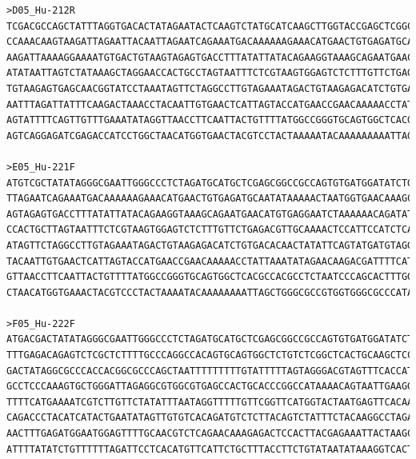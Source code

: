 \begin{verbatim}
>D05_Hu-212R
TCGACGCCAGCTATTTAGGTGACACTATAGAATACTCAAGTCTATGCATCAAGCTTGGTACCGAGCTCGGCTCCACTAGTAACGGCCGCCAGTGTGCTGGAATTCGCCCTTCAGTGAACG
CCAAACAAGTAAGATTAGAATTACAATTAGAATCAGAAATGACAAAAAAGAAACATGAACTGTGAGATGCAATATAAAAACTAATGGTGAACAAAGCAAAGAATAAAAAATAAAAACGGA
AAGATTAAAAGGAAAATGTGACTGTAAGTAGAGTGACCTTTATATTATACAGAAGGTAAAGCAGAATGAACATGTGAGGAATCTAAAAAACAGATATAAAATAGAAACAACTGAAGGCTT
ATATAATTAGTCTATAAAGCTAGGAACCACTGCCTAGTAATTTCTCGTAAGTGGAGTCTCTTTGTTCTGAGACGTTGCAAAACTCCATTCCATCTCAAAGTTATTTTTAATGTTAAAATT
TGTAAGAGTGAGCAACGGTATCCTAAATAGTTCTAGGCCTTGTAGAAATAGACTGTAAGAGACATCTGTGACACAACTATATTCAGTATGATGTAGGGTCTGTTACAATGGGATGAAGTG
AATTTAGATTATTTCAAGACTAAACCTACAATTGTGAACTCATTAGTACCATGAACCGAACAAAAACCTATTAAATATAGAACAAGACGACTTTCATGAAAAAATAAATATGAACAAATC
AGTATTTTCAGTTGTTTGAAATATAGGTTAACCTTCAATTACTGTTTTATGGCCGGGTGCAGTGGCTCACGCCACGCCTCTAATCCCAGCACTTTGGGAGGCCGAGGCAGGCGGATCATG
AGTCAGGAGATCGAGACCATCCTGGCTAACATGGTGAACTACGTCCTACTAAAAATACAAAAAAAAATTAGCTGGGCGCCGTGGTGGGCGCCTATAGTCCAGCTACTTTG

>E05_Hu-221F
ATGTCGCTATATAGGGCGAATTGGGCCCTCTAGATGCATGCTCGAGCGGCCGCCAGTGTGATGGATATCTGCAGAATTCGCCCTTCAGTGAACGCCAAACAAGTAAGATTAGAATTACAA
TTAGAATCAGAAATGACAAAAAAGAAACATGAACTGTGAGATGCAATATAAAAACTAATGGTGAACAAAGCAAAGAATAAAAAATAAAAACGGAAAGATTAAAAGGAAAATGTGACTGTA
AGTAGAGTGACCTTTATATTATACAGAAGGTAAAGCAGAATGAACATGTGAGGAATCTAAAAAACAGATATAAAATAGAAACAACTGAAGGCTTATATAATTAGTCTATAAAGCTAGGAA
CCACTGCTTAGTAATTTCTCGTAAGTGGAGTCTCTTTGTTCTGAGACGTTGCAAAACTCCATTCCATCTCAAAGTTATTTTTAATGTTAAAATTTGTAAGAGTGAGCAACGGTATCCTAA
ATAGTTCTAGGCCTTGTAGAAATAGACTGTAAGAGACATCTGTGACACAACTATATTCAGTATGATGTAGGGTCTGTTACAATGGGATGAAGTGAATTTAGATTATTTCAAGACTAAACC
TACAATTGTGAACTCATTAGTACCATGAACCGAACAAAAACCTATTAAATATAGAACAAGACGATTTTCATGAAAAAATAAATATGAACAAATCAGTATTTTCAGTTGTTTGAAATATAG
GTTAACCTTCAATTACTGTTTTATGGCCGGGTGCAGTGGCTCACGCCACGCCTCTAATCCCAGCACTTTGGGAGGCCGAGGCACGCGGATCATGGGGTCAGGAGATCGAGACCATCCTGG
CTAACATGGTGAAACTACGTCCCTACTAAAATACAAAAAAAATTAGCTGGGCGCCGTGGTGGGCGCCCATAGTCCCAGC

>F05_Hu-222F
ATGACGACTATATAGGGCGAATTGGGCCCTCTAGATGCATGCTCGAGCGGCCGCCAGTGTGATGGATATCTGCAGAATTCGCCCTTGGCCACGCGTCGACTAGTACTTTTTTTTTTTTTT
TTTGAGACAGAGTCTCGCTCTTTTGCCCAGGCCACAGTGCAGTGGCTCTGTCTCGGCTCACTGCAAGCTCCGCCTCCCGGGTTCATGCCATTCTTCTGCATCAGCCTCCCAAGTAGCTGG
GACTATAGGCGCCCACCACGGCGCCCAGCTAATTTTTTTTTGTATTTTTAGTAGGGACGTAGTTTCACCATGTTAGCCAGGATGGTCTCGATCTCCTGACCTCATGATCCGCCTGCCTCG
GCCTCCCAAAGTGCTGGGATTAGAGGCGTGGCGTGAGCCACTGCACCCGGCCATAAAACAGTAATTGAAGGTTAACCTATATTTCAAACAACTGAAAATACTGATTTGTTCATATTTATT
TTTTCATGAAAATCGTCTTGTTCTATATTTAATAGGTTTTTGTTCGGTTCATGGTACTAATGAGTTCACAATTGTAGGTTTAGTCTTGAAATAATCTAAATTCACTTCATCCCATTGTAA
CAGACCCTACATCATACTGAATATAGTTGTGTCACAGATGTCTCTTACAGTCTATTTCTACAAGGCCTAGAACTATTTAGGATACCGTTGCTCACTCTTACAAATTTTAACATTAAAAAT
AACTTTGAGATGGAATGGAGTTTTGCAACGTCTCAGAACAAAGAGACTCCACTTACGAGAAATTACTAAGCAGTGGTTCCTAGCTTTATAGACTAATTATATAAGCCTTCAGTTGTTTCT
ATTTTATATCTGTTTTTTAGATTCCTCACATGTTCATTCTGCTTTACCTTCTGTATAATATAAAGGTCACTCTACTTACAGTCACATTTCCCTTTTAATCTTTCCGTTT


\end{verbatim}
